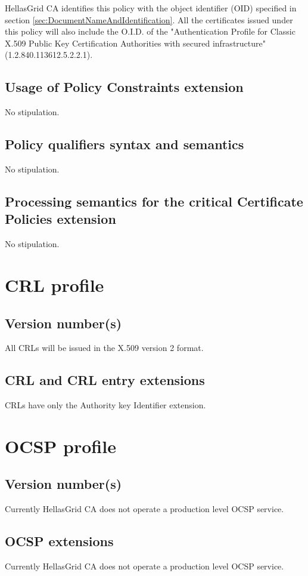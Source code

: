 HellasGrid CA identifies this policy with the object identifier (OID) specified in section \ref{sec:DocumentNameAndIdentification}.  All the certificates issued under this policy will also include the O.I.D. of the "Authentication Profile for Classic X.509 Public Key Certification Authorities with secured infrastructure" (1.2.840.113612.5.2.2.1).

\subsection{Usage of Policy Constraints extension}

No stipulation.

\subsection{Policy qualifiers syntax and semantics}

No stipulation.

\subsection{Processing semantics for the critical Certificate Policies extension}

No stipulation.

\section{CRL profile}
\subsection{Version number(s)}

All CRLs will be issued in the X.509 version 2 format.

\subsection{CRL and CRL entry extensions}

CRLs have only the Authority key Identifier extension.

\section{OCSP profile}

\subsection{Version number(s)}

Currently HellasGrid CA does not operate a production level OCSP service.

\subsection{OCSP extensions}

Currently HellasGrid CA does not operate a production level OCSP service.

